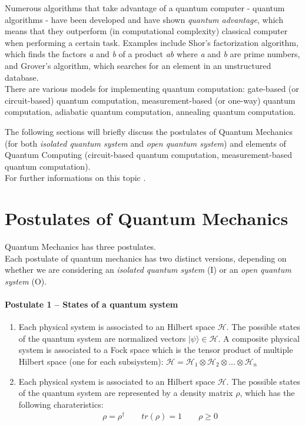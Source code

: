 \begin{itemize}
    Numerous algorithms that take advantage of a quantum computer - quantum algorithms - have been developed and have shown \textit{quantum advantage},
    which means that they outperform (in computational complexity) classical computer when performing a certain task.
    Examples include Shor's factorization algorithm, which finds the factors \textit{a} and \textit{b} of a product \textit{ab} where 
    \textit{a} and \textit{b} are prime numbers, and Grover's algorithm, which searches for an element in an unstructured database.\\
    There are various models for implementing quantum computation: gate-based (or circuit-based) quantum computation, measurement-based (or one-way) 
    quantum computation, adiabatic quantum computation, annealing quantum computation.
\end{itemize}

The following sections will briefly discuss the postulates of Quantum Mechanics (for both \textit{isolated quantum system} and 
\textit{open quantum system}) and elements of Quantum Computing (circuit-based quantum computation, measurement-based quantum computation).\\
For further informations on this topic \cite{Paris_2012}.

\section{Postulates of Quantum Mechanics}

Quantum Mechanics has three postulates.\\
Each postulate of quantum mechanics has two distinct versions, depending on whether we are considering an 
\textit{isolated quantum system} (I) or an \textit{open quantum system} (O).

\paragraph{Postulate 1 – States of a quantum system}
\begin{enumerate}
    \renewcommand{\labelenumi}{I)}
    \item Each physical system is associated to an Hilbert space $\mathcal{H}$. The possible states of the quantum system are 
    normalized vectors $|\psi \rangle \in \mathcal{H}$.
    A composite physical system is associated to a Fock space which is the tensor product of multiple Hilbert space (one for each subsiystem):
    $\mathcal{H} = \mathcal{H}_1 \otimes \mathcal{H}_2 \otimes ... \otimes \mathcal{H}_n$
    \renewcommand{\labelenumi}{O)}
    \item Each physical system is associated to an Hilbert space $\mathcal{H}$. 
    The possible states of the quantum system are represented by a density matrix $\rho$, which has the following charateristics:
    \begin{align}
        \rho = \rho^{\dagger}
        \qquad
        tr(\rho) = 1
        \qquad
        \rho \ge 0
    \end{align}
\end{enumerate}

